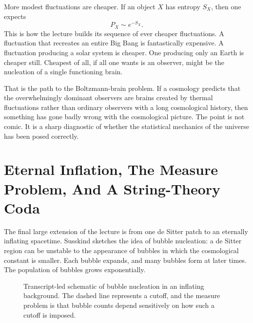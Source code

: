 More modest fluctuations are cheaper. If an object \(X\) has entropy \(S_X\), then one expects
\begin{equation}
P_X\sim e^{-S_X}.
\end{equation}
This is how the lecture builds its sequence of ever cheaper fluctuations. A fluctuation that recreates an entire Big Bang is fantastically expensive. A fluctuation producing a solar system is cheaper. One producing only an Earth is cheaper still. Cheapest of all, if all one wants is an observer, might be the nucleation of a single functioning brain.

That is the path to the Boltzmann-brain problem. If a cosmology predicts that the overwhelmingly dominant observers are brains created by thermal fluctuations rather than ordinary observers with a long cosmological history, then something has gone badly wrong with the cosmological picture. The point is not comic. It is a sharp diagnostic of whether the statistical mechanics of the universe has been posed correctly.

\section{Eternal Inflation, The Measure Problem, And A String-Theory Coda}

The final large extension of the lecture is from one de Sitter patch to an eternally inflating spacetime. Susskind sketches the idea of bubble nucleation: a de Sitter region can be unstable to the appearance of bubbles in which the cosmological constant is smaller. Each bubble expands, and many bubbles form at later times. The population of bubbles grows exponentially.

\begin{figure}
\centering
{}
\caption{Transcript-led schematic of bubble nucleation in an inflating background. The dashed line represents a cutoff, and the measure problem is that bubble counts depend sensitively on how such a cutoff is imposed.}
\end{figure}


